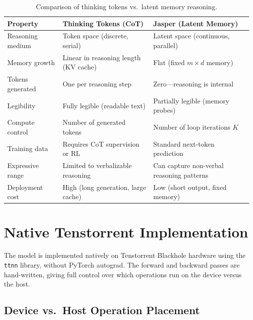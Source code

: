 \documentclass[11pt,a4paper]{article}
\begin{document}
\begin{table}[h]
\centering
\small
\begin{tabularx}{\textwidth}{p{} p{} p{}}
\toprule
\textbf{Property} & \textbf{Thinking Tokens (CoT)} & \textbf{Jasper (Latent Memory)} \\
\midrule
Reasoning medium & Token space (discrete, serial) & Latent space (continuous, parallel) \\
Memory growth & Linear in reasoning length (KV cache) & Flat (fixed $m \times d$ memory) \\
Tokens generated & One per reasoning step & Zero---reasoning is internal \\
Legibility & Fully legible (readable text) & Partially legible (memory probes) \\
Compute control & Number of generated tokens & Number of loop iterations $K$ \\
Training data & Requires CoT supervision or RL & Standard next-token prediction \\
Expressive range & Limited to verbalizable reasoning & Can capture non-verbal reasoning patterns \\
Deployment cost & High (long generation, large cache) & Low (short output, fixed memory) \\
\bottomrule
\end{tabularx}
\caption{Comparison of thinking tokens vs.\ latent memory reasoning.}
\label{tab:cot-comparison}
\end{table}

\section{Native Tenstorrent Implementation}
\label{sec:implementation}

The model is implemented natively on Tenstorrent Blackhole hardware using the \texttt{ttnn} library, without PyTorch autograd. The forward and backward passes are hand-written, giving full control over which operations run on the device versus the host.

\subsection{Device vs.\ Host Operation Placement}
\end{document}
